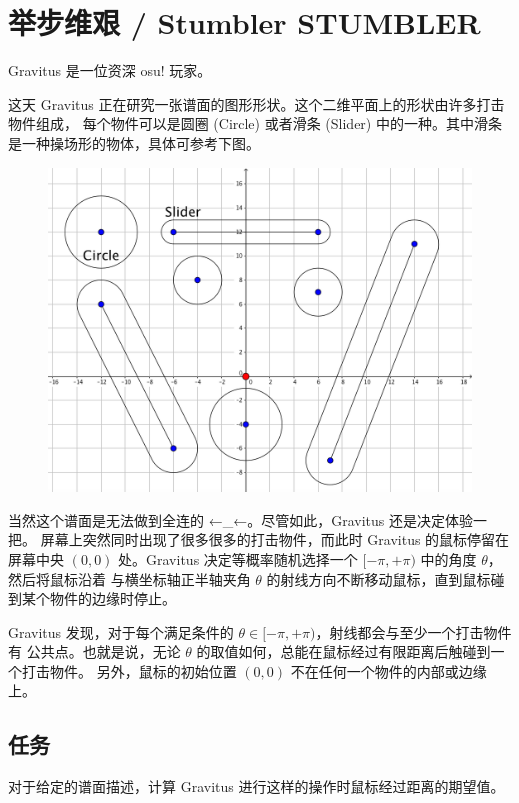 \documentclass[UTF8, 11pt, a4paper]{article}
\begin{document}
\section*{举步维艰 / Stumbler \makebox[2.5em]{} \small{STUMBLER}}
Gravitus 是一位资深 osu! 玩家。

这天 Gravitus 正在研究一张谱面的图形形状。这个二维平面上的形状由许多打击物件组成，%
每个物件可以是圆圈 (Circle) 或者滑条 (Slider) 中的一种。其中滑条是一种操场形的物体，具体可参考下图。

\begin{figure}[h]\centering
\includegraphics[scale=0.2]{desc.png}
\end{figure}

当然这个谱面是无法做到全连的 ←\_←。尽管如此，Gravitus 还是决定体验一把。%
屏幕上突然同时出现了很多很多的打击物件，而此时 Gravitus 的鼠标停留在屏幕中央 $(0, 0)$ %
处。Gravitus 决定等概率随机选择一个 $[-\pi, +\pi)$ 中的角度 $\theta$，然后将鼠标沿着%
与横坐标轴正半轴夹角 $\theta$ 的射线方向不断移动鼠标，直到鼠标碰到某个物件的边缘时停止。

Gravitus 发现，对于每个满足条件的 $\theta \in [-\pi, +\pi)$，射线都会与至少一个打击物件有%
公共点。也就是说，无论 $\theta$ 的取值如何，总能在鼠标经过有限距离后触碰到一个打击物件。%
另外，鼠标的初始位置 $(0, 0)$ 不在任何一个物件的内部或边缘上。

\subsection*{任务}
对于给定的谱面描述，计算 Gravitus 进行这样的操作时鼠标经过距离的期望值。
\end{document}
